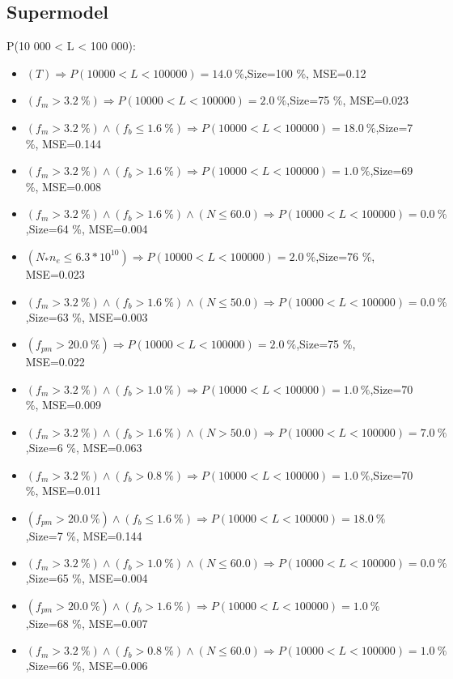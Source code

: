 \documentclass[numbered]{CSL}
\begin{document}
\subsection{Supermodel}
P(10 000 < L < 100 000):
\begin{itemize}
\item $(T) \Rightarrow P(10 000 < L < 100 000) = 14.0~\%$,\hfill Size=100 \%, MSE=0.12
\item $(f_m > 3.2~\%) \Rightarrow P(10 000 < L < 100 000) = 2.0~\%$,\hfill Size=75 \%, MSE=0.023
\item $(f_m > 3.2~\%) \land (f_b \leq 1.6~\%) \Rightarrow P(10 000 < L < 100 000) = 18.0~\%$,\hfill Size=7 \%, MSE=0.144
\item $(f_m > 3.2~\%) \land (f_b > 1.6~\%) \Rightarrow P(10 000 < L < 100 000) = 1.0~\%$,\hfill Size=69 \%, MSE=0.008
\item $(f_m > 3.2~\%) \land (f_b > 1.6~\%) \land (N \leq 60.0) \Rightarrow P(10 000 < L < 100 000) = 0.0~\%$,\hfill Size=64 \%, MSE=0.004
\item $(N_* n_e \leq 6.3 * 10^{10}) \Rightarrow P(10 000 < L < 100 000) = 2.0~\%$,\hfill Size=76 \%, MSE=0.023
\item $(f_m > 3.2~\%) \land (f_b > 1.6~\%) \land (N \leq 50.0) \Rightarrow P(10 000 < L < 100 000) = 0.0~\%$,\hfill Size=63 \%, MSE=0.003
\item $(f_{pm} > 20.0~\%) \Rightarrow P(10 000 < L < 100 000) = 2.0~\%$,\hfill Size=75 \%, MSE=0.022
\item $(f_m > 3.2~\%) \land (f_b > 1.0~\%) \Rightarrow P(10 000 < L < 100 000) = 1.0~\%$,\hfill Size=70 \%, MSE=0.009
\item $(f_m > 3.2~\%) \land (f_b > 1.6~\%) \land (N > 50.0) \Rightarrow P(10 000 < L < 100 000) = 7.0~\%$,\hfill Size=6 \%, MSE=0.063
\item $(f_m > 3.2~\%) \land (f_b > 0.8~\%) \Rightarrow P(10 000 < L < 100 000) = 1.0~\%$,\hfill Size=70 \%, MSE=0.011
\item $(f_{pm} > 20.0~\%) \land (f_b \leq 1.6~\%) \Rightarrow P(10 000 < L < 100 000) = 18.0~\%$,\hfill Size=7 \%, MSE=0.144
\item $(f_m > 3.2~\%) \land (f_b > 1.0~\%) \land (N \leq 60.0) \Rightarrow P(10 000 < L < 100 000) = 0.0~\%$,\hfill Size=65 \%, MSE=0.004
\item $(f_{pm} > 20.0~\%) \land (f_b > 1.6~\%) \Rightarrow P(10 000 < L < 100 000) = 1.0~\%$,\hfill Size=68 \%, MSE=0.007
\item $(f_m > 3.2~\%) \land (f_b > 0.8~\%) \land (N \leq 60.0) \Rightarrow P(10 000 < L < 100 000) = 1.0~\%$,\hfill Size=66 \%, MSE=0.006

\end{itemize}
\end{document}
